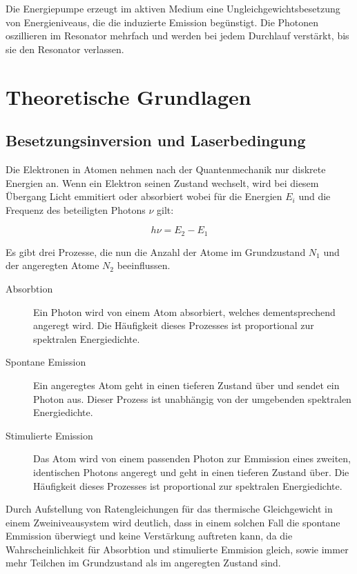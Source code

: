 \documentclass[slug=GL, room=HZDR\ Dresden/Rossendorf\,\ Geb.\ 620/123, supervisor=Tim\ Ziegler]{../../Lab_Report_LaTeX/lab_report}
\begin{document}
Die Energiepumpe erzeugt im aktiven Medium eine
Ungleichgewichtsbesetzung von Energieniveaus, die die induzierte
Emission beg\"unstigt. Die Photonen oszillieren im Resonator mehrfach
und werden bei jedem Durchlauf verst\"arkt, bis sie den
Resonator verlassen.

\section{Theoretische Grundlagen}%
\label{sec:theo}

\subsection{Besetzungsinversion und Laserbedingung}%
\label{sec:inv}

Die Elektronen in Atomen nehmen nach der Quantenmechanik nur diskrete
Energien an. Wenn ein Elektron seinen Zustand wechselt, wird bei
diesem \"Ubergang Licht emmitiert oder absorbiert wobei f\"ur die
Energien \(E_i\) und die Frequenz des beteiligten Photons \(\nu\) gilt:

\begin{equation}
  \label{eq:transfreq}
  h\nu = E_2 - E_1
\end{equation}

Es gibt drei Prozesse, die nun die Anzahl der Atome im Grundzustand
\(N_1\) und der angeregten Atome \(N_2\) beeinflussen.

\begin{description}
\item[Absorbtion] Ein Photon wird von einem Atom absorbiert, welches
  dementsprechend angeregt wird. Die H\"aufigkeit dieses Prozesses ist
  proportional zur spektralen Energiedichte.
\item[Spontane Emission] Ein angeregtes Atom geht in einen tieferen
  Zustand \"uber und sendet ein Photon aus. Dieser Prozess ist
  unabh\"angig von der umgebenden spektralen Energiedichte.
\item[Stimulierte Emission] Das Atom wird von einem passenden Photon
  zur Emmission eines zweiten, identischen Photons angeregt und geht
  in einen tieferen Zustand \"uber. Die H\"aufigkeit dieses Prozesses ist
  proportional zur spektralen Energiedichte.
\end{description}

Durch Aufstellung von Ratengleichungen f\"ur das thermische
Gleichgewicht in einem Zweiniveausystem wird deutlich, dass in einem
solchen Fall die spontane Emmission \"uberwiegt und keine
Verst\"arkung auftreten kann, da die Wahrscheinlichkeit f\"ur Absorbtion
und stimulierte Emmision gleich, sowie immer mehr Teilchen im
Grundzustand als im angeregten Zustand sind.
\end{document}
